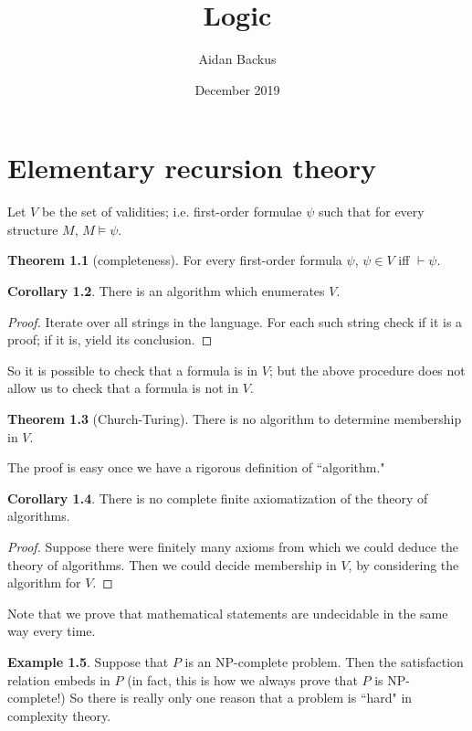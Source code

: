 \documentclass[12pt]{report}
\title{Logic}
\author{Aidan Backus}
\date{December 2019}
\newcommand{\proves}{\vdash}
\theoremstyle{definition}
\newtheorem{theorem}{Theorem}[chapter]
\newtheorem{corollary}[theorem]{Corollary}
\newtheorem{example}[theorem]{Example}
\begin{document}
\maketitle

\tableofcontents

\chapter{Elementary recursion theory}
Let $V$ be the set of validities; i.e. first-order formulae $\psi$ such that for every structure $M$, $M \models \psi$.

\begin{theorem}[completeness]
For every first-order formula $\psi$, $\psi \in V$ iff $\proves \psi$.
\end{theorem}
\begin{corollary}
There is an algorithm which enumerates $V$.
\end{corollary}
\begin{proof}
Iterate over all strings in the language. For each such string check if it is a proof; if it is, yield its conclusion.
\end{proof}
So it is possible to check that a formula is in $V$; but the above procedure does not allow us to check that a formula is not in $V$.
\begin{theorem}[Church-Turing]
There is no algorithm to determine membership in $V$.
\end{theorem}
The proof is easy once we have a rigorous definition of ``algorithm."
\begin{corollary}
There is no complete finite axiomatization of the theory of algorithms.
\end{corollary}
\begin{proof}
Suppose there were finitely many axioms from which we could deduce the theory of algorithms. Then we could decide membership in $V$, by considering the algorithm for $V$.
\end{proof}
Note that we prove that mathematical statements are undecidable in the same way every time.
\begin{example}
Suppose that $P$ is an NP-complete problem. Then the satisfaction relation embeds in $P$ (in fact, this is how we always prove that $P$ is NP-complete!) So there is really only one reason that a problem is ``hard" in complexity theory.
\end{example}
\end{document}
